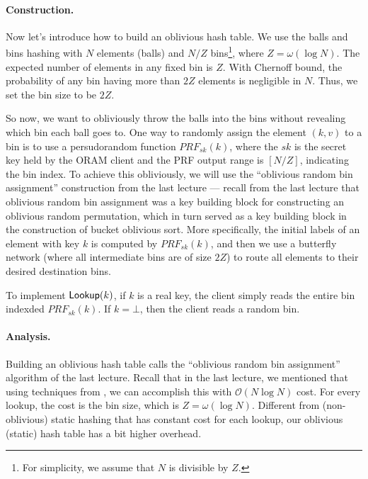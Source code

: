 \paragraph{Construction.}
Now let's introduce how to build an oblivious hash table.
We use the balls and bins hashing with $N$ elements (balls) and $N / Z$ 
bins\footnote{For simplicity, we assume that $N$ is divisible by $Z$.}, where $Z=\omega(\log N)$.
The expected number of elements in any fixed bin is $Z$. 
With Chernoff bound, the probability of any bin having more than $2Z$ elements is negligible in $N$.
Thus, we set the bin size to be $2Z$.

So now, we want to obliviously throw the balls into the bins without revealing which bin each ball goes to.
One way to randomly assign the element $(k, v)$ to a bin is to use a persudorandom function $PRF_{sk}(k)$, where the $sk$ is the secret key held by the ORAM client and the PRF output range is $[N/Z]$, indicating the bin index.
To achieve this obliviously, we will use the 
``oblivious random bin assignment''
construction from the last lecture --- recall
from the last lecture that oblivious random bin assignment
was a key building block for constructing
an oblivious random permutation, which 
in turn served as a key building block in the construction
of bucket oblivious sort.
More specifically, the initial labels of an element with key $k$ 
is computed by $PRF_{sk}(k)$, and then we use a butterfly
network (where all intermediate bins are of size $2Z$)
to route all elements to their desired destination bins.

To implement ${\sf Lookup}(k)$, if $k$ is a real key,
the client simply reads the entire bin indexded $PRF_{sk}(k)$.
If $k = \bot$, then 
the client reads a random bin.

\paragraph{Analysis.} 
Building an oblivious hash table %
calls the ``oblivious random bin assignment'' algorithm
of the last lecture.  
Recall that in the last lecture,
we mentioned 
that using techniques from \cite{domulticore, tianyao-sort}, 
we can accomplish this with 
$\mathcal{O}(N \log N)$ cost. %
For every lookup, the cost is the bin size, which is $Z = \omega(\log N)$.
Different from (non-oblivious) 
static hashing that has constant cost for each lookup, 
our oblivious (static) hash table has a bit higher overhead.

